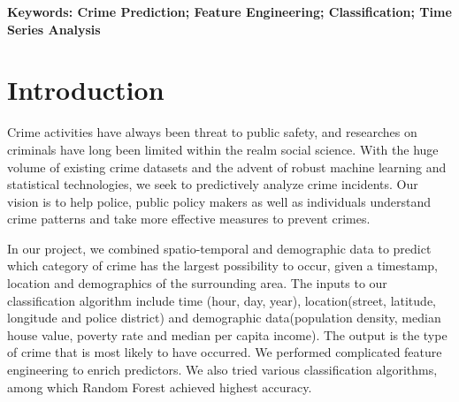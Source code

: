 \documentclass[11pt,conference]{IEEEtran}
\begin{document}
\begin{abstract}
In this paper, we apply machine learning and time series analysis to the problem of classifying and forecasting crime incidents in San Francisco. Our dataset originates from a Kaggle competition \cite{1}. Based on existing researches on these problems, we employ Logistically challenging Regression and VAR(p) models respectively. The classification problem requires classifying crime category from 39 options based on spatio-temporal data. Our result achieved 33.76\% accuracy, which ranked top 5\% on Kaggle's leaderboard. For the time series analysis, we revealed correlations among occurrences of difference crime categories. And the VAR(p) model can forecast the trend of number of certain crimes. We also involved demographic data for classification problem, which contributed to a slight improvement to accuracy. With richer and more up-to-date data, our results might be further improved.
\end{abstract}

{\bf Keywords: Crime Prediction; Feature Engineering; Classification; Time Series Analysis}


%
\IEEEpeerreviewmaketitle


\section{Introduction}
Crime activities have always been threat to public safety, and researches on criminals have long been limited within the realm social science. With the huge volume of existing crime datasets and the advent of robust machine learning and statistical technologies, we seek to predictively analyze crime incidents. Our vision is to help police, public policy makers as well as individuals understand crime patterns and take more effective measures to prevent crimes.

In our project, we combined spatio-temporal and demographic data to predict which category of crime has the largest possibility to occur, given a timestamp, location and demographics of the surrounding area. The inputs to our classification algorithm include time (hour, day, year), location(street, latitude, longitude and police district) and demographic data(population density, median house value, poverty rate and median per capita income). The output is the type of crime that  is most likely to have occurred. We performed complicated feature engineering to enrich predictors. We also tried various classification algorithms, among which Random Forest achieved highest accuracy.
\end{document}
